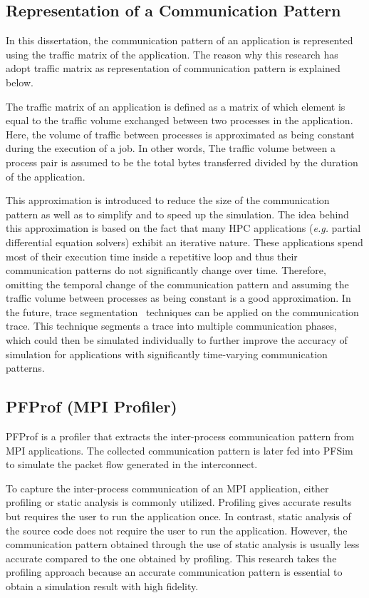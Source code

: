 \subsection{Representation of a Communication Pattern}

In this dissertation, the communication pattern of an application is
represented using the traffic matrix of the application. The reason why this
research has adopt traffic matrix as representation of communication pattern
is explained below.

The traffic matrix of an application is defined as a matrix of which element
is equal to the traffic volume exchanged between two processes in the
application. Here, the volume of traffic between processes is approximated as
being constant during the execution of a job. In other words, The traffic
volume between a process pair is assumed to be the total bytes transferred
divided by the duration of the application.

This approximation is introduced to reduce the size of the communication
pattern as well as to simplify and to speed up the simulation. The idea behind
this approximation is based on the fact that many HPC applications
(\emph{e.g.} partial differential equation solvers) exhibit an iterative
nature. These applications spend most of their execution time inside a
repetitive loop and thus their communication patterns do not significantly
change over time. Therefore, omitting the temporal change of the communication
pattern and assuming the traffic volume between processes as being constant is
a good approximation. In the future, trace segmentation~\autocite{Alawneh2016}
techniques can be applied on the communication trace. This technique
segments a trace into multiple communication phases, which could then be
simulated individually to further improve the accuracy of simulation for
applications with significantly time-varying communication patterns.

\subsection{PFProf (MPI Profiler)}\label{sec:ii-pfprof}

PFProf is a profiler that extracts the inter-process communication pattern
from MPI applications. The collected communication pattern is later fed into
PFSim to simulate the packet flow generated in the interconnect.

To capture the inter-process communication of an MPI application, either
profiling or static analysis is commonly utilized. Profiling gives accurate
results but requires the user to run the application once. In contrast, static
analysis of the source code does not require the user to run the application.
However, the communication pattern obtained through the use of static analysis
is usually less accurate compared to the one obtained by profiling. This
research takes the profiling approach because an accurate communication
pattern is essential to obtain a simulation result with high fidelity.

